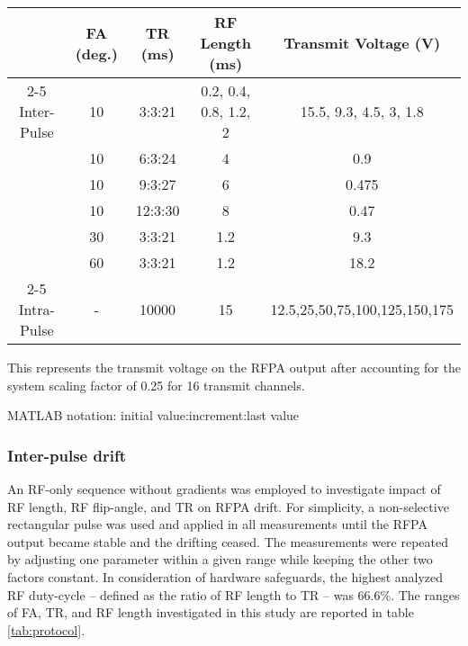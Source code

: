 \begin{table*}[t]%
\caption{\ FA, TR, RF length, and transmit voltages examined for inter-pulse and intra-pulse RFPA drift assessment.\label{tab:protocol}}
\begin{tabular*}{\textwidth}{@{\extracolsep\fill}ccccc}
\toprule
 & \textbf{FA (deg.)} & \textbf{TR (ms)} & \textbf{RF Length (ms)} & \textbf{Transmit Voltage\tnote{$^{1}$} (V)} \\ \cline{2-5} 
\multirow{5}{*} {Inter-Pulse} & 10 & 3:3:21\tnote{$^{2}$} & 0.2, 0.4, 0.8, 1.2, 2 & 15.5, 9.3, 4.5, 3, 1.8 \\
 & 10 & 6:3:24 & 4 & 0.9 \\
 & 10 & 9:3:27 & 6 & 0.475\\
 & 10 & 12:3:30 & 8 & 0.47\\
 & 30 & 3:3:21 & 1.2 & 9.3 \\
 & 60 & 3:3:21 & 1.2 & 18.2 \\ \cline{2-5} 
Intra-Pulse & - & 10000 & 15 & 12.5,25,50,75,100,125,150,175 \\
\bottomrule
\end{tabular*}
\begin{tablenotes}%
\item[$^{1}$] This represents the transmit voltage on the RFPA output after accounting for the system scaling factor of 0.25 for 16 transmit channels.
\item[$^{2}$] MATLAB notation: initial value:increment:last value
\end{tablenotes}
\end{table*}

\subsubsection{Inter-pulse drift}
An RF-only sequence without gradients was employed to investigate impact of RF length, RF flip-angle, and TR on RFPA drift. For simplicity, a non-selective rectangular pulse was used and applied in all measurements until the RFPA output became stable and the drifting ceased. The measurements were repeated by adjusting one parameter within a given range while keeping the other two factors constant. In consideration of hardware safeguards, the highest analyzed RF duty-cycle -- defined as the ratio of RF length to TR -- was 66.6\%.  The ranges of FA, TR, and RF length investigated in this study are reported in table \ref{tab:protocol}. 


